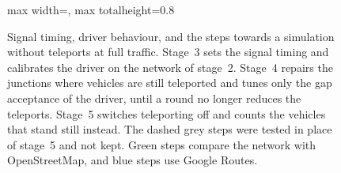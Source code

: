 \begin{figure}[htbp]
\begin{adjustbox}{max width=\textwidth, max totalheight=0.8\textheight}
    \end{adjustbox}
    \caption{Signal timing, driver behaviour, and the steps towards a
    simulation without teleports at full traffic. Stage~3 sets the
    signal timing and calibrates the driver on the network of stage~2.
    Stage~4 repairs the junctions where vehicles are still teleported
    and tunes only the gap acceptance of the driver, until a round no
    longer reduces the teleports. Stage~5 switches teleporting off and
    counts the vehicles that stand still instead. The dashed grey steps
    were tested in place of stage~5 and not kept. Green steps compare
    the network with OpenStreetMap, and blue steps use Google Routes.}
    \label{fig:full-traffic-flow}
\end{figure}
